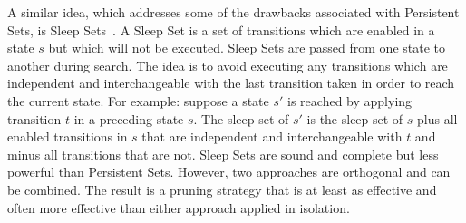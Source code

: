 A similar idea, which addresses some of the drawbacks associated with
Persistent Sets, is Sleep Sets~\citep{godefroid93,godefroid96}. A Sleep Set is
a set of transitions which are enabled in a state $s$ but which will not be
executed. Sleep Sets are passed from one state to another during search. The
idea is to avoid executing any transitions which are independent and
interchangeable with the last transition taken in order to reach the current
state.  For example: suppose a state $s'$ is reached by applying transition
$t$ in a preceding state $s$.  The sleep set of $s'$ is the sleep set of $s$
plus all enabled transitions in $s$ that are independent and interchangeable
with $t$ and minus all transitions that are not.  Sleep Sets are sound and
complete but less powerful than Persistent Sets. However, two approaches are
orthogonal and can be combined. The result is a pruning strategy that is at
least as effective and often more effective than either approach applied in
isolation.

